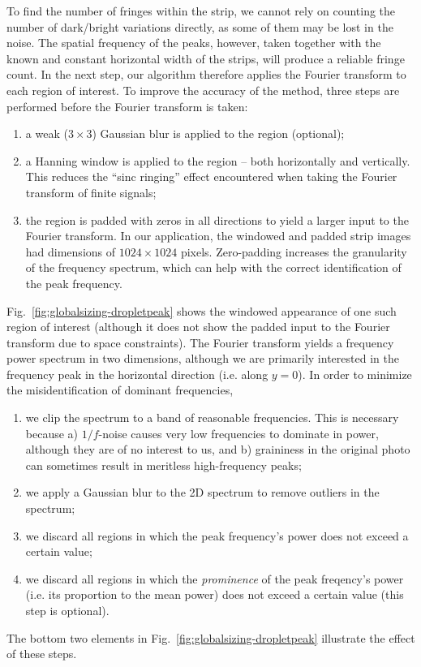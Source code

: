 \documentclass[11.5pt,oneside]{book}
\newcommand*{\figref}[1]{Fig.~\ref{#1}}
\begin{document}
To find the number of fringes within the strip, we cannot rely on counting the
number of dark/bright variations directly, as some of them may be lost in the
noise. The spatial frequency of the peaks, however, taken together with the
known and constant horizontal width of the strips, will produce a reliable
fringe count. In the next step, our algorithm therefore applies the Fourier
transform to each region of interest. To improve the accuracy of the method,
three steps are performed before the Fourier transform is taken:
\begin{enumerate}
    \item a weak ($3 \times 3$) Gaussian blur is applied to the region
        (optional);
    \item a Hanning window is applied to the region -- both horizontally and
        vertically. This reduces the ``sinc ringing'' effect encountered when
        taking the Fourier transform of finite signals;
    \item the region is padded with zeros in all directions to yield a larger
        input to the Fourier transform. In our application, the windowed and padded strip
        images had dimensions of $1024 \times 1024$ pixels. Zero-padding
        increases the granularity of the frequency spectrum, which can help with
        the correct identification of the peak frequency.
\end{enumerate}

\figref{fig:globalsizing-dropletpeak} shows the windowed appearance of
one such region of interest (although it does not show the padded input to the
Fourier transform due to space constraints). The Fourier transform yields a
frequency power spectrum in two dimensions, although we are primarily interested
in the frequency peak in the horizontal direction (i.e. along $y=0$). In order
to minimize the misidentification of dominant frequencies,
\begin{enumerate}
    \item we clip the spectrum to a band of reasonable frequencies. This is
        necessary because a) $1/f$-noise causes very low frequencies to dominate
        in power, although they are of no interest to us, and b) graininess in
        the original photo can sometimes result in meritless high-frequency
        peaks;
    \item we apply a Gaussian blur to the 2D spectrum to remove outliers in the
        spectrum;
    \item we discard all regions in which the peak frequency's power does not
        exceed a certain value;
    \item we discard all regions in which the \textit{prominence} of the peak
        freqency's power (i.e. its proportion to the mean power) does not exceed
        a certain value (this step is optional).
\end{enumerate}
The bottom two elements in \figref{fig:globalsizing-dropletpeak} illustrate
the effect of these steps.
\end{document}
